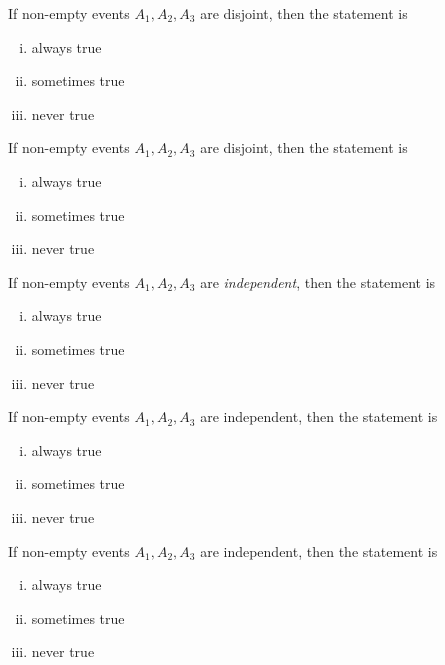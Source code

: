 \documentclass[12pt]{article}
\begin{document}
 If non-empty events $A_1, A_2, A_3$ are disjoint, then the statement  is

\begin{enumerate}[(i)]
\item always true
\item sometimes true
\item never true
\end{enumerate}

 If non-empty events $A_1, A_2, A_3$ are disjoint, then the statement  is

\begin{enumerate}[(i)]
\item always true
\item sometimes true
\item never true
\end{enumerate}


 If non-empty events $A_1, A_2, A_3$ are \emph{independent}, then the statement  is

\begin{enumerate}[(i)]
\item always true
\item sometimes true
\item never true
\end{enumerate}

 If non-empty events $A_1, A_2, A_3$ are independent, then the statement  is

\begin{enumerate}[(i)]
\item always true
\item sometimes true
\item never true
\end{enumerate}

 If non-empty events $A_1, A_2, A_3$ are independent, then the statement  is

\begin{enumerate}[(i)]
\item always true
\item sometimes true
\item never true
\end{enumerate}
\end{document}
